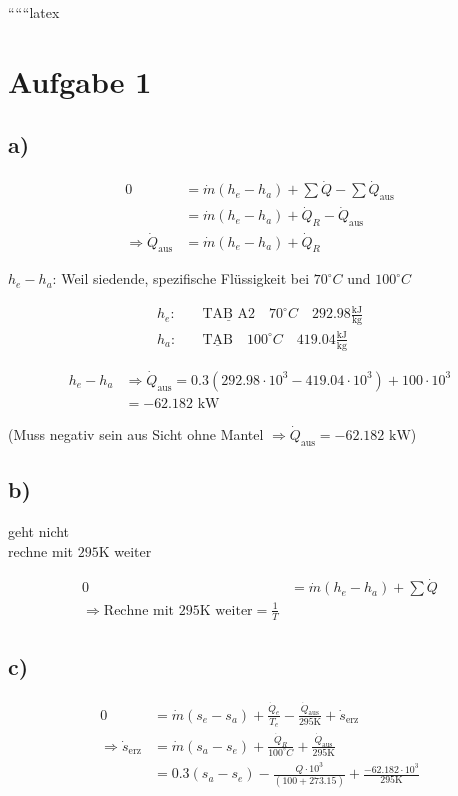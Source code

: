 
``````latex


\section*{Aufgabe 1}

\subsection*{a)}
\begin{align*}
0 &= \dot{m} (h_e - h_a) + \sum \dot{Q} - \sum \dot{Q}_\text{aus} \\
  &= \dot{m} (h_e - h_a) + \dot{Q}_R - \dot{Q}_\text{aus} \\
\Rightarrow \dot{Q}_\text{aus} &= \dot{m} (h_e - h_a) + \dot{Q}_R
\end{align*}

$h_e - h_a$: Weil siedende, spezifische Flüssigkeit bei $70^\circ C$ und $100^\circ C$

\begin{align*}
h_e: & \quad \underline{\text{TAB A2}} \quad 70^\circ C \quad 292.98 \frac{\text{kJ}}{\text{kg}} \\
h_a: & \quad \underline{\text{TAB}} \quad 100^\circ C \quad 419.04 \frac{\text{kJ}}{\text{kg}}
\end{align*}

\begin{align*}
h_e - h_a &\Rightarrow \dot{Q}_\text{aus} = 0.3 \left( 292.98 \cdot 10^3 - 419.04 \cdot 10^3 \right) + 100 \cdot 10^3 \\
          &= -62.182 \text{ kW}
\end{align*}

(Muss negativ sein aus Sicht ohne Mantel $\Rightarrow \dot{Q}_\text{aus} = -62.182 \text{ kW}$)

\subsection*{b)}
geht nicht \\
rechne mit $295 \text{K}$ weiter

\begin{align*}
0 &= \dot{m} (h_e - h_a) + \sum \dot{Q} \\
\Rightarrow \text{Rechne mit } 295 \text{K} \text{ weiter} = \frac{1}{T}
\end{align*}

\subsection*{c)}
\begin{align*}
0 &= \dot{m} (s_e - s_a) + \frac{\dot{Q}_e}{T_e} - \frac{\dot{Q}_\text{aus}}{295 \text{K}} + \dot{s}_\text{erz} \\
\Rightarrow \dot{s}_\text{erz} &= \dot{m} (s_a - s_e) + \frac{\dot{Q}_R}{100^\circ C} + \frac{\dot{Q}_\text{aus}}{295 \text{K}} \\
                               &= 0.3 (s_a - s_e) - \frac{Q \cdot 10^3}{(100 + 273.15)} + \frac{-62.182 \cdot 10^3}{295 \text{K}}
\end{align*}

